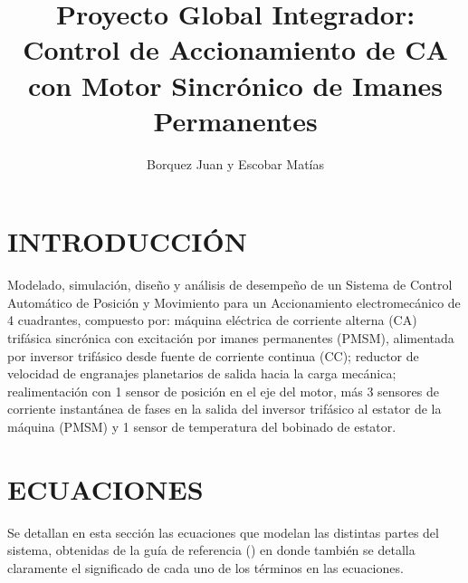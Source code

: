 \documentclass[a4paper, 10pt, onecolumn,journal]{ieeeconf}
\title{\LARGE \bf
Proyecto Global Integrador: Control de Accionamiento de CA con
Motor Sincrónico de Imanes Permanentes
}
\author{Borquez Juan y Escobar Matías}
\begin{document}
\maketitle
\thispagestyle{empty}
\pagestyle{fancy}

\begin{abstract}
\end{abstract}

\section{INTRODUCCIÓN}
Modelado, simulación, diseño y análisis de desempeño de un Sistema de Control Automático de Posición y Movimiento para un Accionamiento electromecánico de 4 cuadrantes, compuesto por: máquina eléctrica de corriente alterna (CA) trifásica sincrónica con excitación por imanes permanentes (PMSM), alimentada por inversor trifásico desde fuente de corriente continua (CC); reductor de velocidad de engranajes planetarios de salida hacia la carga mecánica; realimentación con 1 sensor de posición en el eje del motor, más 3 sensores de corriente instantánea de fases en la salida del inversor trifásico al estator de la máquina (PMSM) y 1 sensor de temperatura del bobinado de estator.

\section{ECUACIONES}
Se detallan en esta sección las ecuaciones que modelan las distintas partes del sistema, obtenidas de la guía de referencia (\cite{c1}) en donde también se detalla claramente el significado de cada uno de los términos en las ecuaciones.
\end{document}
